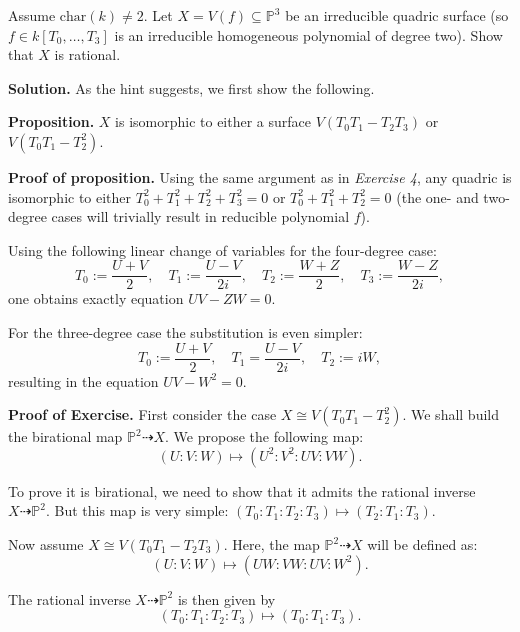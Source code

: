 \documentclass{template}
\begin{document}
\begin{problem}[Exercise 5]
    Assume $\text{char}(k) \neq 2$. Let $X=V(f) \subseteq \mathbb{P}^3$ be an
    irreducible quadric surface (so $f \in k[T_0,\dots,T_3]$ is an irreducible
    homogeneous polynomial of degree two). Show that $X$ is rational.
\end{problem}

\textbf{Solution.} As the hint suggests, we first show the following.

\textcolor{blue!70!black}{\textbf{Proposition.}} $X$ is isomorphic to either a
surface $V(T_0T_1-T_2T_3)$ or $V(T_0T_1-T_2^2)$.

\textbf{Proof of proposition.} Using the same argument as in \textit{Exercise
4}, any quadric is isomorphic to either $T_0^2+T_1^2+T_2^2+T_3^2=0$ or
$T_0^2+T_1^2+T_2^2=0$ (the one- and two-degree cases will trivially result in
reducible polynomial $f$). 

Using the following linear change of variables for the four-degree case:
\begin{equation*}
    T_0 := \frac{U+V}{2}, \quad T_1 := \frac{U-V}{2i}, \quad T_2 := \frac{W+Z}{2}, \quad T_3 := \frac{W-Z}{2i},
\end{equation*}
one obtains exactly equation $UV-ZW=0$. 

For the three-degree case the substitution is even simpler:
\begin{equation*}
    T_0 := \frac{U+V}{2}, \quad T_1 = \frac{U-V}{2i}, \quad T_2 := iW,
\end{equation*}
resulting in the equation $UV-W^2=0$.

\textcolor{blue!70!black}{\textbf{Proof of Exercise.}} First consider the case
$X \cong V(T_0T_1 - T_2^2)$. We shall build the birational map $\mathbb{P}^2 \dashrightarrow
X$. We propose the following map:
\begin{equation*}
    (U:V:W) \mapsto (U^2: V^2: UV : VW).
\end{equation*}

To prove it is birational, we need to show that it admits the rational inverse
$X \dashrightarrow \mathbb{P}^2$. But this map is very simple:
$(T_0:T_1:T_2:T_3) \mapsto (T_2:T_1:T_3)$.

Now assume $X \cong V(T_0T_1-T_2T_3)$. Here, the map $\mathbb{P}^2 \dashrightarrow X$
will be defined as:
\begin{equation*}
    (U:V:W) \mapsto (UW:VW:UV:W^2).
\end{equation*}

The rational inverse $X \dashrightarrow \mathbb{P}^2$ is then given by
\begin{equation*}
    (T_0:T_1:T_2:T_3) \mapsto (T_0:T_1:T_3).
\end{equation*}

\nocite{*}
\renewcommand{\refname}{}


\end{document}
